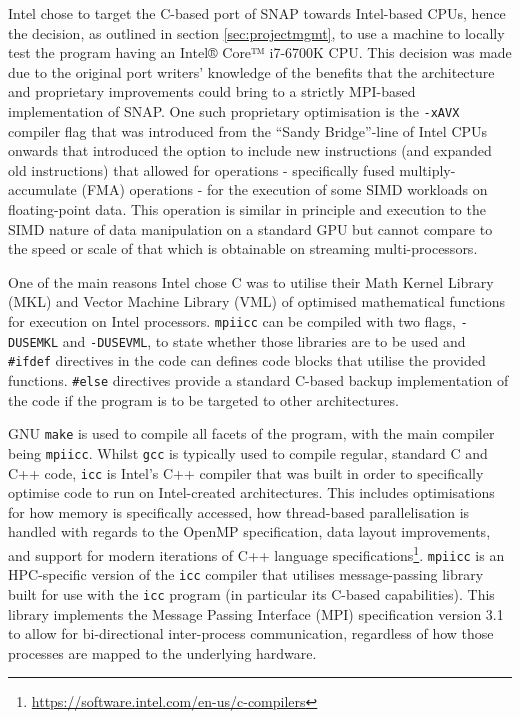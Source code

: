 \documentclass[conference]{IEEEtran}
\begin{document}
Intel chose to target the C-based port of SNAP towards Intel-based CPUs, hence the decision, as outlined in section \ref{sec:projectmgmt}, to use a machine to locally test the program having an Intel® Core™ i7-6700K CPU. This decision was made due to the original port writers' knowledge of the benefits that the architecture and proprietary improvements could bring to a strictly MPI-based implementation of SNAP. One such proprietary optimisation is the \texttt{-xAVX} compiler flag that was introduced from the ``Sandy Bridge''-line of Intel CPUs onwards that introduced the option to include new instructions (and expanded old instructions) that allowed for operations - specifically fused multiply-accumulate (FMA) operations - for the execution of some SIMD workloads on floating-point data\cite{KanterIntel}. This operation is similar in principle and execution to the SIMD nature of data manipulation on a standard GPU but cannot compare to the speed or scale of that which is obtainable on streaming multi-processors.

One of the main reasons Intel chose C was to utilise their Math Kernel Library (MKL) and Vector Machine Library (VML) of optimised mathematical functions for execution on Intel processors. \texttt{mpiicc} can be compiled with two flags, \texttt{-DUSEMKL} and \texttt{-DUSEVML}, to state whether those libraries are to be used and \texttt{\#ifdef} directives in the code can defines code blocks that utilise the provided functions. \texttt{\#else} directives provide a standard C-based backup implementation of the code if the program is to be targeted to other architectures.

GNU \texttt{make} is used to compile all facets of the program, with the main compiler being \texttt{mpiicc}. Whilst \texttt{gcc} is typically used to compile regular, standard C and C++ code, \texttt{icc} is Intel's C++ compiler that was built in order to specifically optimise code to run on Intel-created architectures. This includes optimisations for how memory is specifically accessed, how thread-based parallelisation is handled with regards to the OpenMP specification, data layout improvements, and support for modern iterations of C++ language specifications\footnote{\url{https://software.intel.com/en-us/c-compilers}}. \texttt{mpiicc} is an HPC-specific version of the \texttt{icc} compiler that utilises message-passing library built for use with the \texttt{icc} program (in particular its C-based capabilities). This library implements the Message Passing Interface (MPI) specification version 3.1\cite{intel-mpi-ref} to allow for bi-directional inter-process communication, regardless of how those processes are mapped to the underlying hardware.
\end{document}

